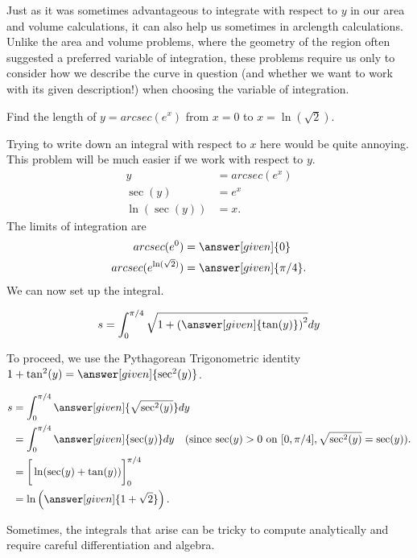 \documentclass{ximera}
\begin{document}
Just as it was sometimes advantageous to integrate with respect to $y$ in our area and volume calculations, it can also help us sometimes in arclength calculations.  Unlike the area and volume problems, where the geometry of the region often suggested a preferred variable of integration, these problems require us only to consider how we describe the curve in question (and whether we want to work with its given description!) when choosing the variable of integration.
 
\begin{example}
  Find the length of $y = arcsec(e^x)$ from $x= 0$ to  $x=\ln(\sqrt{2})$.
  \begin{explanation}
    Trying to write down an integral with respect to $x$ here would be quite annoying.  This problem will be much easier if we work with respect to $y$. 
    \begin{align*}
      y &= arcsec(e^x)\\
      \sec(y) &= e^x\\
      \ln(\sec(y)) &= x.
    \end{align*}
    The limits of integration are
    \begin{align*}
      arcsec(e^0) &= \answer[given]{0}\\
      arcsec(e^{\ln(\sqrt{2})}) &= \answer[given]{\pi/4} .
    \end{align*}
We can now set up the integral.

\[ 
s = \int_0^{\pi/4} \sqrt{1+\left( \answer[given]{\tan(y)} \right)^2} dy\\      
      \]

To proceed, we use the Pythagorean Trigonometric identity $1+\tan^2(y) = \answer[given]{\sec^2(y)}$.

    \begin{align*}
     s  &=\int_0^{\pi/4} \answer[given]{\sqrt{\sec^2(y)}} dy\\
      &=\int_0^{\pi/4} \answer[given]{\sec(y)} dy \quad (\textrm{since $\sec(y)>0$  on } [0, \pi/4], \sqrt{\sec^2(y)} = \sec(y)). \\
      &=\bigg[\ln(\sec(y)+\tan(y))\bigg]_0^{\pi/4}\\
      &=\ln \left(\answer[given]{1+\sqrt{2}} \right).
    \end{align*}
  \end{explanation}
\end{example}

Sometimes, the integrals that arise can be tricky to compute analytically and require careful differentiation and algebra.
\end{document}
